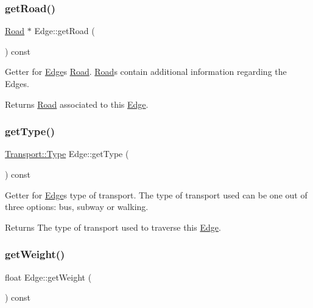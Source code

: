 \subsubsection{\texorpdfstring{get\+Road()}{getRoad()}}
{\footnotesize\ttfamily \hyperlink{class_road}{Road} $\ast$ Edge\+::get\+Road (\begin{DoxyParamCaption}{ }\end{DoxyParamCaption}) const}

Getter for \hyperlink{class_edge}{Edge}\textquotesingle{}s \hyperlink{class_road}{Road}. \hyperlink{class_road}{Road}\textquotesingle{}s contain additional information regarding the Edges.

\begin{DoxyReturn}{Returns}
\hyperlink{class_road}{Road} associated to this \hyperlink{class_edge}{Edge}. 
\end{DoxyReturn}
\hypertarget{class_edge_ad36b220701f80c199f9b2ed7bb79a22f}{}\label{class_edge_ad36b220701f80c199f9b2ed7bb79a22f} 
\subsubsection{\texorpdfstring{get\+Type()}{getType()}}
{\footnotesize\ttfamily \hyperlink{class_transport_a1879cecfed0d4238e5a7af6d085db317}{Transport\+::\+Type} Edge\+::get\+Type (\begin{DoxyParamCaption}{ }\end{DoxyParamCaption}) const}

Getter for \hyperlink{class_edge}{Edge}\textquotesingle{}s type of transport. The type of transport used can be one out of three options\+: bus, subway or walking.

\begin{DoxyReturn}{Returns}
The type of transport used to traverse this \hyperlink{class_edge}{Edge}. 
\end{DoxyReturn}
\hypertarget{class_edge_a873322923fa6340e17edb39b923f7d61}{}\label{class_edge_a873322923fa6340e17edb39b923f7d61} 
\subsubsection{\texorpdfstring{get\+Weight()}{getWeight()}}
{\footnotesize\ttfamily float Edge\+::get\+Weight (\begin{DoxyParamCaption}{ }\end{DoxyParamCaption}) const}

